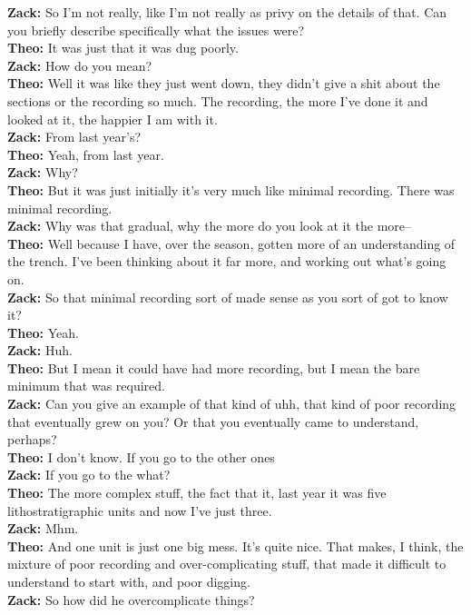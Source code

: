 \documentclass[
]{article}
\begin{document}
\textbf{Zack:} So I'm not really, like I'm not really as privy on the
details of that. Can you briefly describe specifically what the issues
were?\\
\textbf{Theo:} It was just that it was dug poorly.\\
\textbf{Zack:} How do you mean?\\
\textbf{Theo:} Well it was like they just went down, they didn't give a
shit about the sections or the recording so much. The recording, the
more I've done it and looked at it, the happier I am with it.\\
\textbf{Zack:} From last year's?\\
\textbf{Theo:} Yeah, from last year.\\
\textbf{Zack:} Why?\\
\textbf{Theo:} But it was just initially it's very much like minimal
recording. There was minimal recording.\\
\textbf{Zack:} Why was that gradual, why the more do you look at it the
more--\\
\textbf{Theo:} Well because I have, over the season, gotten more of an
understanding of the trench. I've been thinking about it far more, and
working out what's going on.\\
\textbf{Zack:} So that minimal recording sort of made sense as you sort
of got to know it?\\
\textbf{Theo:} Yeah.\\
\textbf{Zack:} Huh.\\
\textbf{Theo:} But I mean it could have had more recording, but I mean
the bare minimum that was required.\\
\textbf{Zack:} Can you give an example of that kind of uhh, that kind of
poor recording that eventually grew on you? Or that you eventually came
to understand, perhaps?\\
\textbf{Theo:} I don't know. If you go to the other ones\\
\textbf{Zack:} If you go to the what?\\
\textbf{Theo:} The more complex stuff, the fact that it, last year it
was five lithostratigraphic units and now I've just three.\\
\textbf{Zack:} Mhm.\\
\textbf{Theo:} And one unit is just one big mess. It's quite nice. That
makes, I think, the mixture of poor recording and over-complicating
stuff, that made it difficult to understand to start with, and poor
digging.\\
\textbf{Zack:} So how did he overcomplicate things?\\
\end{document}
